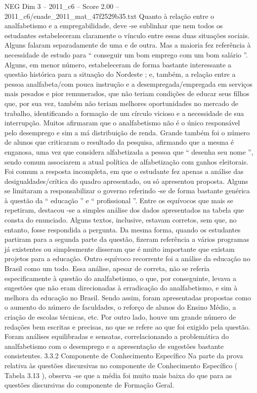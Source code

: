 \begin{textsample}{NEG Dim 3 – 2011\_c6 – Score 2.00 – 2011\_c6/enade\_2011\_mat\_47f2529b35.txt}
Quanto à relação entre o analfabetismo e a empregabilidade, deve -se sublinhar que nem todos os estudantes estabeleceram claramente o vínculo entre essas duas situações sociais.
Alguns falaram separadamente de uma e de outra.
Mas a maioria fez referência à necessidade de estudo para “ conseguir um bom emprego com um bom salário ”.
Alguns, em menor número, estabeleceram de forma bastante interessante a questão histórica para a situação do Nordeste ; e, também, a relação entre a pessoa analfabeta/com pouca instrução e a desempregada/empregada em serviços mais pesados e pior remunerados, que não teriam condições de educar seus filhos que, por sua vez, também não teriam melhores oportunidades no mercado de trabalho, identificando a formação de um círculo vicioso e a necessidade de sua interrupção.
Muitos afirmaram que o analfabetismo não é o único responsável pelo desemprego e sim a má distribuição de renda.
Grande também foi o número de alunos que criticaram o resultado da pesquisa, afirmando que a mesma é enganosa, uma vez que considera alfabetizada a pessoa que “ desenha seu nome ”, sendo comum associarem a atual política de alfabetização com ganhos eleitorais.
Foi comum a resposta incompleta, em que o estudante fez apenas a análise das desigualdades/crítica do quadro apresentado, ou só apresentou proposta.
Alguns se limitaram a responsabilizar o governo referindo -se de forma bastante genérica à questão da “ educação ” e “ profissional ”.
Entre os equívocos que mais se repetiram, destacou -se a simples análise dos dados apresentados na tabela que consta do enunciado.
Alguns textos, inclusive, estavam corretos, sem que, no entanto, fosse respondida a pergunta.
Da mesma forma, quando os estudantes partiram para a segunda parte da questão, fizeram referência a vários programas já existentes ou simplesmente disseram que é muito importante que existam projetos para a educação.
Outro equívoco recorrente foi a análise da educação no Brasil como um todo.
Essa análise, apesar de correta, não se referia especificamente à questão do analfabetismo, o que, por conseguinte, levava a sugestões que não eram direcionadas à erradicação do analfabetismo, e sim à melhora da educação no Brasil.
Sendo assim, foram apresentadas propostas como o aumento do número de faculdades, o reforço de alunos do Ensino Médio, a criação de escolas técnicas, etc.
Por outro lado, houve um grande número de redações bem escritas e precisas, no que se refere ao que foi exigido pela questão.
Foram análises equilibradas e sensatas, correlacionando a problemática do analfabetismo com o desemprego e a apresentação de sugestões bastante consistentes. 3.3.2 Componente de Conhecimento Específico Na parte da prova relativa às questões discursivas no componente de Conhecimento Específico ( Tabela 3.13 ), observa -se que a média foi muito mais baixa do que para as questões discursivas do componente de Formação Geral.

\end{textsample}
